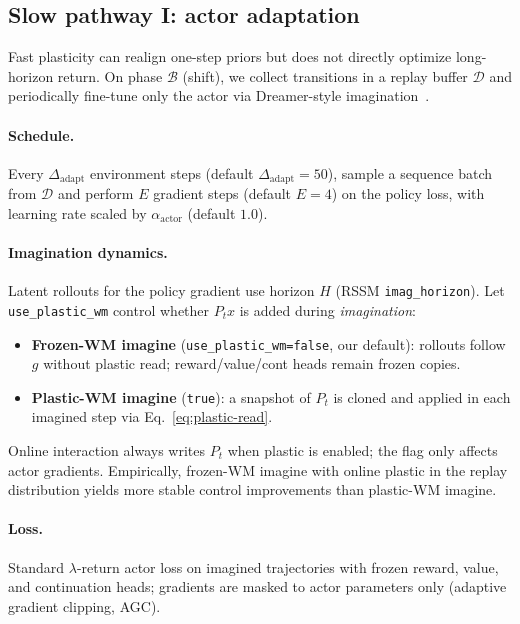 \subsection{Slow pathway I: actor adaptation}
\label{sec:slow-actor}

Fast plasticity can realign one-step priors but does not directly optimize long-horizon return.
On phase $\mathcal{B}$ (shift), we collect transitions in a replay buffer $\mathcal{D}$ and periodically fine-tune only the actor via Dreamer-style imagination~\cite{hafner2020dream}.

\paragraph{Schedule.}
Every $\Delta_{\mathrm{adapt}}$ environment steps (default $\Delta_{\mathrm{adapt}}=50$), sample a sequence batch from $\mathcal{D}$ and perform $E$ gradient steps (default $E=4$) on the policy loss, with learning rate scaled by $\alpha_{\mathrm{actor}}$ (default $1.0$).

\paragraph{Imagination dynamics.}
Latent rollouts for the policy gradient use horizon $H$ (RSSM \texttt{imag\_horizon}).
Let \texttt{use\_plastic\_wm} control whether $P_t x$ is added during \emph{imagination}:
\begin{itemize}[leftmargin=*, itemsep=1pt]
  \item \textbf{Frozen-WM imagine} (\texttt{use\_plastic\_wm=false}, our default): rollouts follow $g$ without plastic read; reward/value/cont heads remain frozen copies.
  \item \textbf{Plastic-WM imagine} (\texttt{true}): a snapshot of $P_t$ is cloned and applied in each imagined step via Eq.~\eqref{eq:plastic-read}.
\end{itemize}
Online interaction always writes $P_t$ when plastic is enabled; the flag only affects actor gradients.
Empirically, frozen-WM imagine with online plastic in the replay distribution yields more stable control improvements than plastic-WM imagine.

\paragraph{Loss.}
Standard $\lambda$-return actor loss on imagined trajectories with frozen reward, value, and continuation heads; gradients are masked to actor parameters only (adaptive gradient clipping, AGC).

